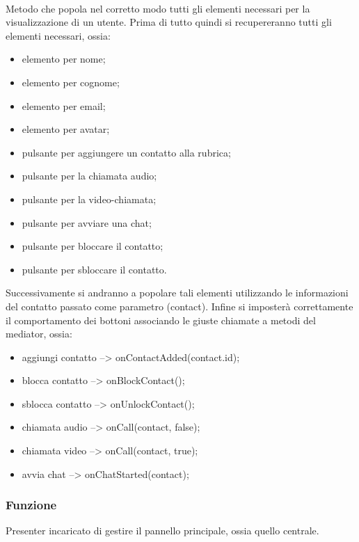\begin{description}
\item{}\\
Metodo che popola nel corretto modo tutti gli elementi necessari per la visualizzazione di un utente. Prima di tutto quindi si recupereranno tutti gli elementi necessari, ossia:
\begin{itemize}
\item elemento per nome;
\item elemento per cognome;
\item elemento per email;
\item elemento per avatar;
\item pulsante per aggiungere un contatto alla rubrica;
\item pulsante per la chiamata audio;
\item pulsante per la video-chiamata;
\item pulsante per avviare una chat;
\item pulsante per bloccare il contatto;
\item pulsante per sbloccare il contatto.
\end{itemize}
Successivamente si andranno a popolare tali elementi utilizzando le informazioni del contatto passato come parametro (contact). Infine si imposterà correttamente il comportamento dei bottoni associando le giuste chiamate a metodi del mediator, ossia:
\begin{itemize}
\item aggiungi contatto --> onContactAdded(contact.id);
\item blocca contatto --> onBlockContact();
\item sblocca contatto --> onUnlockContact();
\item chiamata audio --> onCall(contact, false);
\item chiamata video --> onCall(contact, true);
\item avvia chat --> onChatStarted(contact);
\end{itemize}

\end{description}


\subsubsection*{Funzione}
Presenter incaricato di gestire il pannello principale, ossia quello centrale.

